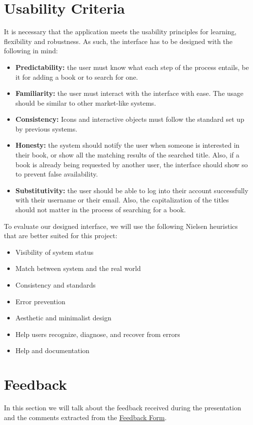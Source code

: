 \documentclass{article}
\begin{document}
\section{Usability Criteria}
It is necessary that the application meets the usability principles for learning, flexibility and robustness. As such, the interface has to be designed with the following in mind:
\begin{itemize}
    \item \textbf{Predictability:} the user must know what each step of the process entails, be it for adding a book or to search for one. 
    \item \textbf{Familiarity:} the user must interact with the interface with ease. The usage should be similar to other market-like systems.
    \item \textbf{Consistency:} Icons and interactive objects must follow the standard set up by previous systems. 
    \item \textbf{Honesty:} the system should notify the user when someone is interested in their book, or show all the matching results of the searched title. Also, if a book is already being requested by another user, the interface should show so to prevent false availability.
    \item \textbf{Substitutivity:} the user should be able to log into their account successfully with their username or their email. Also, the capitalization of the titles should not matter in the process of searching for a book.
\end{itemize}

To evaluate our designed interface, we will use the following Nielsen heuristics that are better suited for this project:
\begin{itemize}[itemsep=1pt, parsep=1pt]
    \item Visibility of system status
    \item Match between system and the real world
    \item Consistency and standards
    \item Error prevention
    \item Aesthetic and minimalist design
    \item Help users recognize, diagnose, and recover from errors
    \item Help and documentation
\end{itemize}


\section{Feedback}
In this section we will talk about the feedback received during the presentation and the comments extracted from the \href{https://docs.google.com/forms/d/1PoXi9NhbjuxqX-TVijiMF3n5Dru8blxZACKOnZKqEVQ/edit?usp=sharing}{Feedback Form}. 
\end{document}
